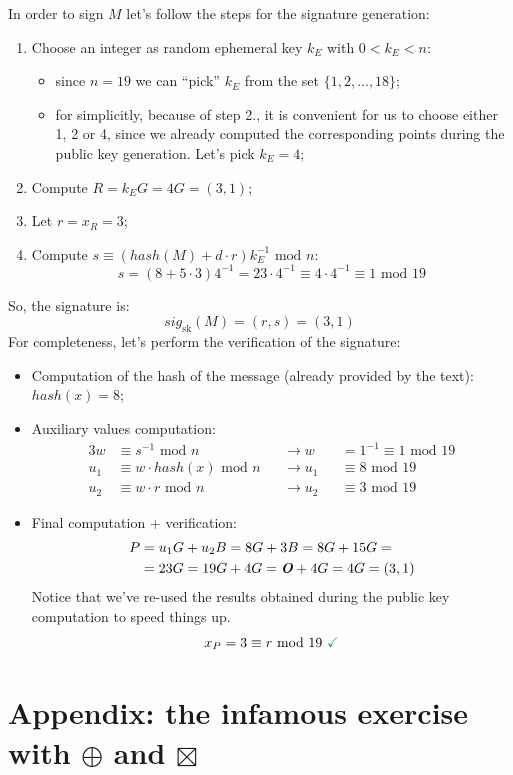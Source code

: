 \documentclass[11pt, a4paper]{article}
\newcommand{\doublequotes}[1]{“#1”}
\newcommand{\mymod}{
    \text{ mod }
}
\begin{document}
\newpage
\hfill\break
In order to sign $M$ let's follow the steps for the signature generation:
\begin{enumerate}
    \item Choose an integer as random ephemeral key $k_E$ with $0<k_E<n$:
    \begin{itemize}
        \item since $n=19$ we can \doublequotes{pick} $k_E$ from the set $\{1,2,...,18\}$;
        \item for simplicitly, because of step 2., it is convenient for us to choose either 1, 2 or 4, since we already computed the corresponding points during the public key generation. Let's pick $k_E=4$;
    \end{itemize}
    \item Compute $R=k_EG=4G=(3,1)$;
    \item Let $r=x_R=3$;
    \item Compute $s\equiv (hash(M)+d\cdot r)k_E^{-1}\mymod n$:
    $$s=(8+5\cdot3)4^{-1}=23\cdot4^{-1}\equiv4\cdot4^{-1}\equiv1\mymod19$$
\end{enumerate}
So, the signature is:
$$sig_{\text{sk}}(M)=(r,s)=(3,1)$$
For completeness, let's perform the verification of the signature:
\begin{itemize}
    \item Computation of the hash of the message (already provided by the text): $hash(x)=8$;
    \item Auxiliary values computation:
    \begin{alignat*}{3}
        w&\equiv s^{-1}\mymod n&&\longrightarrow w&&=1^{-1}\equiv1\mymod19\\
        u_1&\equiv w\cdot hash(x)\mymod n&&\longrightarrow u_1&&\equiv8\mymod19\\
        u_2&\equiv w\cdot r\mymod n&&\longrightarrow u_2&&\equiv3\mymod19
    \end{alignat*}
    \item Final computation + verification:
    \begin{align*}
        P&=u_1G+u_2B=8G+3B=8G+15G=\\
        &=23G=19G+4G=\text{\textbf{\textit{O}}}+4G=4G=(3,1)
    \end{align*}
    Notice that we've re-used the results obtained during the public key computation to speed things up.
    $$x_P=3\equiv r\mymod 19\text{ \textcolor{Green}{\checkmark}}$$
\end{itemize}

\newpage
\section{Appendix: the infamous exercise with $\oplus$ and $\boxtimes$}
\end{document}
